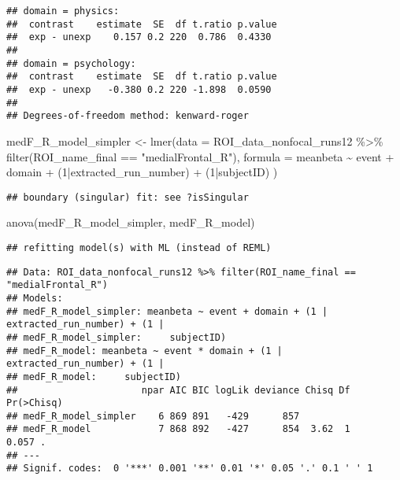 \documentclass[
]{article}
\newenvironment{Shaded}{\begin{snugshade}}{\end{snugshade}}
\newcommand{\AttributeTok}[1]{\textcolor[rgb]{0.77,0.63,0.00}{#1}}
\newcommand{\DecValTok}[1]{\textcolor[rgb]{0.00,0.00,0.81}{#1}}
\newcommand{\FunctionTok}[1]{\textcolor[rgb]{0.00,0.00,0.00}{#1}}
\newcommand{\NormalTok}[1]{#1}
\newcommand{\OtherTok}[1]{\textcolor[rgb]{0.56,0.35,0.01}{#1}}
\newcommand{\SpecialCharTok}[1]{\textcolor[rgb]{0.00,0.00,0.00}{#1}}
\newcommand{\StringTok}[1]{\textcolor[rgb]{0.31,0.60,0.02}{#1}}
\begin{document}
\begin{verbatim}
## domain = physics:
##  contrast    estimate  SE  df t.ratio p.value
##  exp - unexp    0.157 0.2 220  0.786  0.4330 
## 
## domain = psychology:
##  contrast    estimate  SE  df t.ratio p.value
##  exp - unexp   -0.380 0.2 220 -1.898  0.0590 
## 
## Degrees-of-freedom method: kenward-roger
\end{verbatim}

\begin{Shaded}
\begin{Highlighting}[]
\NormalTok{medF\_R\_model\_simpler }\OtherTok{\textless{}{-}} \FunctionTok{lmer}\NormalTok{(}\AttributeTok{data =}\NormalTok{ ROI\_data\_nonfocal\_runs12 }\SpecialCharTok{\%\textgreater{}\%}
        \FunctionTok{filter}\NormalTok{(ROI\_name\_final }\SpecialCharTok{==} \StringTok{"medialFrontal\_R"}\NormalTok{),}
      \AttributeTok{formula =}\NormalTok{ meanbeta }\SpecialCharTok{\textasciitilde{}}\NormalTok{ event }\SpecialCharTok{+}\NormalTok{ domain }\SpecialCharTok{+}\NormalTok{ (}\DecValTok{1}\SpecialCharTok{|}\NormalTok{extracted\_run\_number) }\SpecialCharTok{+}\NormalTok{ (}\DecValTok{1}\SpecialCharTok{|}\NormalTok{subjectID)}
\NormalTok{    )}
\end{Highlighting}
\end{Shaded}

\begin{verbatim}
## boundary (singular) fit: see ?isSingular
\end{verbatim}

\begin{Shaded}
\begin{Highlighting}[]
\FunctionTok{anova}\NormalTok{(medF\_R\_model\_simpler, medF\_R\_model)}
\end{Highlighting}
\end{Shaded}

\begin{verbatim}
## refitting model(s) with ML (instead of REML)
\end{verbatim}

\begin{verbatim}
## Data: ROI_data_nonfocal_runs12 %>% filter(ROI_name_final == "medialFrontal_R")
## Models:
## medF_R_model_simpler: meanbeta ~ event + domain + (1 | extracted_run_number) + (1 | 
## medF_R_model_simpler:     subjectID)
## medF_R_model: meanbeta ~ event * domain + (1 | extracted_run_number) + (1 | 
## medF_R_model:     subjectID)
##                      npar AIC BIC logLik deviance Chisq Df Pr(>Chisq)  
## medF_R_model_simpler    6 869 891   -429      857                      
## medF_R_model            7 868 892   -427      854  3.62  1      0.057 .
## ---
## Signif. codes:  0 '***' 0.001 '**' 0.01 '*' 0.05 '.' 0.1 ' ' 1
\end{verbatim}
\end{document}
